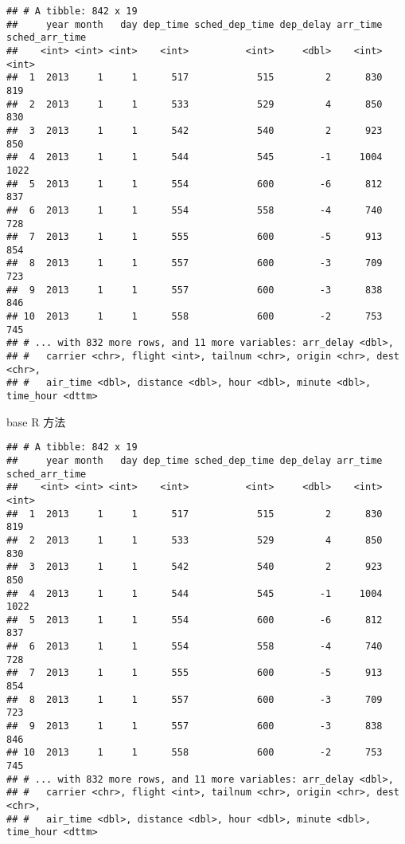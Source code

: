\documentclass[
]{article}
\newenvironment{Shaded}{\begin{snugshade}}{\end{snugshade}}
\newcommand{\DecValTok}[1]{\textcolor[rgb]{0.00,0.00,0.81}{#1}}
\newcommand{\NormalTok}[1]{#1}
\newcommand{\OperatorTok}[1]{\textcolor[rgb]{0.81,0.36,0.00}{\textbf{#1}}}
\newcommand{\StringTok}[1]{\textcolor[rgb]{0.31,0.60,0.02}{#1}}
\begin{document}
\begin{verbatim}
## # A tibble: 842 x 19
##     year month   day dep_time sched_dep_time dep_delay arr_time sched_arr_time
##    <int> <int> <int>    <int>          <int>     <dbl>    <int>          <int>
##  1  2013     1     1      517            515         2      830            819
##  2  2013     1     1      533            529         4      850            830
##  3  2013     1     1      542            540         2      923            850
##  4  2013     1     1      544            545        -1     1004           1022
##  5  2013     1     1      554            600        -6      812            837
##  6  2013     1     1      554            558        -4      740            728
##  7  2013     1     1      555            600        -5      913            854
##  8  2013     1     1      557            600        -3      709            723
##  9  2013     1     1      557            600        -3      838            846
## 10  2013     1     1      558            600        -2      753            745
## # ... with 832 more rows, and 11 more variables: arr_delay <dbl>,
## #   carrier <chr>, flight <int>, tailnum <chr>, origin <chr>, dest <chr>,
## #   air_time <dbl>, distance <dbl>, hour <dbl>, minute <dbl>, time_hour <dttm>
\end{verbatim}

base R 方法

\begin{Shaded}
\end{Shaded}

\begin{verbatim}
## # A tibble: 842 x 19
##     year month   day dep_time sched_dep_time dep_delay arr_time sched_arr_time
##    <int> <int> <int>    <int>          <int>     <dbl>    <int>          <int>
##  1  2013     1     1      517            515         2      830            819
##  2  2013     1     1      533            529         4      850            830
##  3  2013     1     1      542            540         2      923            850
##  4  2013     1     1      544            545        -1     1004           1022
##  5  2013     1     1      554            600        -6      812            837
##  6  2013     1     1      554            558        -4      740            728
##  7  2013     1     1      555            600        -5      913            854
##  8  2013     1     1      557            600        -3      709            723
##  9  2013     1     1      557            600        -3      838            846
## 10  2013     1     1      558            600        -2      753            745
## # ... with 832 more rows, and 11 more variables: arr_delay <dbl>,
## #   carrier <chr>, flight <int>, tailnum <chr>, origin <chr>, dest <chr>,
## #   air_time <dbl>, distance <dbl>, hour <dbl>, minute <dbl>, time_hour <dttm>
\end{verbatim}
\end{document}
